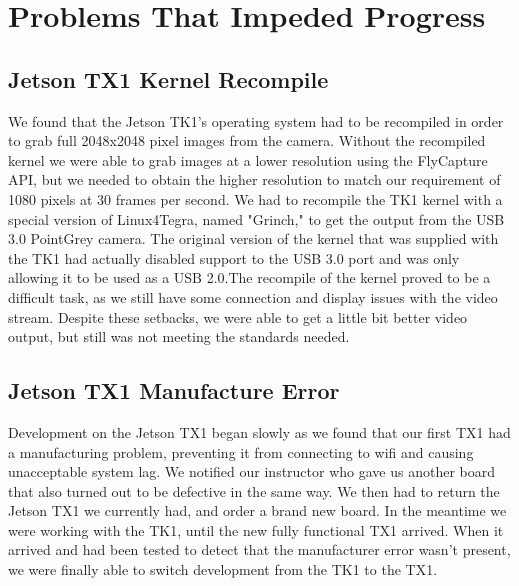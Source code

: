 \documentclass[letterpaper,10pt,titlepage]{IEEEtran}
\begin{document}
   
\section{Problems That Impeded Progress}
   
   \subsection{Jetson TX1 Kernel Recompile}
   We found that the Jetson TK1's operating system had to be recompiled in order to grab full 2048x2048 pixel images from the camera. Without the recompiled kernel we were able to grab images at a lower resolution using the FlyCapture API, but we needed to obtain the higher resolution to match our requirement of 1080 pixels at 30 frames per second. We had to recompile the TK1 kernel with a special version of Linux4Tegra, named "Grinch," to get the output from the USB 3.0 PointGrey camera. The original version of the kernel that was supplied with the TK1 had actually disabled support to the USB 3.0 port and was only allowing it to be used as a USB 2.0.The recompile of the kernel proved to be a difficult task, as we still have some connection and display issues with the video stream. Despite these setbacks, we were able to get a little bit better video output, but still was not meeting the standards needed.	
   
   \subsection{Jetson TX1 Manufacture Error}
   Development on the Jetson TX1 began slowly as we found that our first TX1 had a manufacturing problem, preventing it from connecting to wifi and causing unacceptable system lag. We notified our instructor who gave us another board that also turned out to be defective in the same way. We then had to return the Jetson TX1 we currently had, and order a brand new board. In the meantime we were working with the TK1, until the new fully functional TX1 arrived. When it arrived and had been tested to detect that the manufacturer error wasn't present, we were finally able to switch development from the TK1 to the TX1.
   
\end{document}
